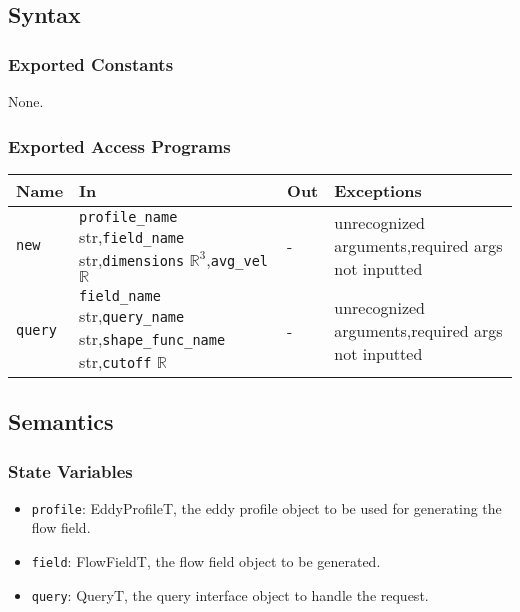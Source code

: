 \documentclass[12pt, titlepage]{article}
\begin{document}
\subsection{Syntax}

\subsubsection{Exported Constants}
None.

\subsubsection{Exported Access Programs}

\begin{center}
\begin{tabular}{p{2cm} p{4cm} p{2.5cm} p{5cm}}
\hline
\textbf{Name} & \textbf{In} & \textbf{Out} & \textbf{Exceptions} \\
\hline
\texttt{new}  & \texttt{profile\_name} str,\newline\texttt{field\_name} str,\newline\texttt{dimensions} $\mathbb{R}^3$,\newline\texttt{avg\_vel} $\mathbb{R}$ & - & unrecognized arguments,\newline required args not inputted\\
\texttt{query}  & \texttt{field\_name} str,\newline\texttt{query\_name} str,\newline\texttt{shape\_func\_name} str,\newline\texttt{cutoff} $\mathbb{R}$ & - & unrecognized arguments,\newline required args not inputted\\
\hline
\end{tabular}
\end{center}

\subsection{Semantics}

\subsubsection{State Variables}
\begin{itemize}
  \item \texttt{profile}: EddyProfileT, the eddy profile object to be used for generating the flow field.
  \item \texttt{field}: FlowFieldT, the flow field object to be generated.
  \item \texttt{query}: QueryT, the query interface object to handle the request.
\end{itemize}
\end{document}
